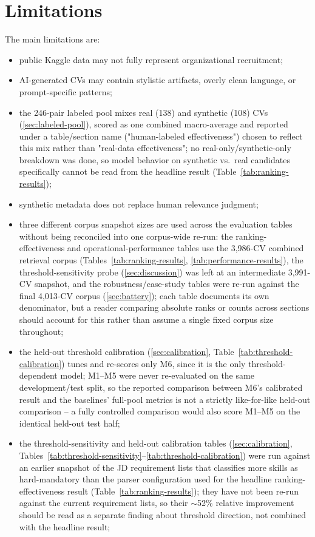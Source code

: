 \documentclass[12pt,a4paper,oneside]{report}
\begin{document}
\section{Limitations}
\label{sec:limitations-list}
The main limitations are:
\begin{itemize}
  \item public Kaggle data may not fully represent organizational recruitment;
  \item AI-generated CVs may contain stylistic artifacts, overly clean language, or prompt-specific patterns;
  \item the 246-pair labeled pool mixes real (138) and synthetic (108) CVs (\cref{sec:labeled-pool}), scored as one combined macro-average and reported under a table/section name ("human-labeled effectiveness") chosen to reflect this mix rather than "real-data effectiveness"; no real-only/synthetic-only breakdown was done, so model behavior on synthetic vs.\ real candidates specifically cannot be read from the headline result (Table~\ref{tab:ranking-results});
  \item synthetic metadata does not replace human relevance judgment;
  \item three different corpus snapshot sizes are used across the evaluation tables without being reconciled into one corpus-wide re-run: the ranking-effectiveness and operational-performance tables use the 3,986-CV combined retrieval corpus (Tables~\ref{tab:ranking-results}, \ref{tab:performance-results}), the threshold-sensitivity probe (\cref{sec:discussion}) was left at an intermediate 3,991-CV snapshot, and the robustness/case-study tables were re-run against the final 4,013-CV corpus (\cref{sec:battery}); each table documents its own denominator, but a reader comparing absolute ranks or counts across sections should account for this rather than assume a single fixed corpus size throughout;
  \item the held-out threshold calibration (\cref{sec:calibration}, Table~\ref{tab:threshold-calibration}) tunes and re-scores only M6, since it is the only threshold-dependent model; M1--M5 were never re-evaluated on the same development/test split, so the reported comparison between M6's calibrated result and the baselines' full-pool metrics is not a strictly like-for-like held-out comparison -- a fully controlled comparison would also score M1--M5 on the identical held-out test half;
  \item the threshold-sensitivity and held-out calibration tables (\cref{sec:calibration}, Tables~\ref{tab:threshold-sensitivity}--\ref{tab:threshold-calibration}) were run against an earlier snapshot of the JD requirement lists that classifies more skills as hard-mandatory than the parser configuration used for the headline ranking-effectiveness result (Table~\ref{tab:ranking-results}); they have not been re-run against the current requirement lists, so their $\sim$52\% relative improvement should be read as a separate finding about threshold direction, not combined with the headline result;

\end{itemize}
\end{document}
